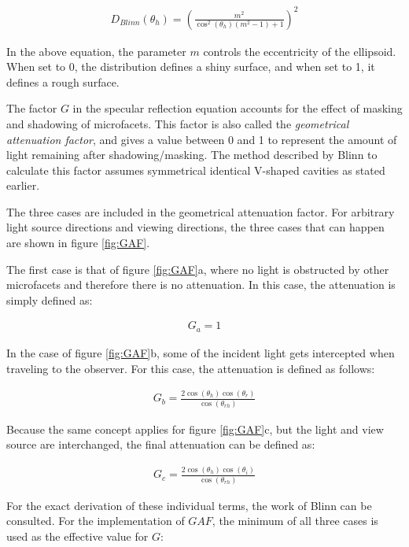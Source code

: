 	\begin{eqnarray*}
		D_{Blinn}(\theta_h) = \left({ \frac{m^2}{\cos^2(\theta_h)(m^2-1)+1} } \right)^2
	\end{eqnarray*}

\noindent In the above equation, the parameter $m$ controls the eccentricity of the ellipsoid. When set to 0, the distribution defines a shiny surface, and when set to 1, it defines a rough surface.

The factor $G$ in the specular reflection equation accounts for the effect of masking and shadowing of microfacets. This factor is also called the \textit{geometrical attenuation factor}, and gives a value between 0 and 1 to represent the amount of light remaining after shadowing/masking. The method described by Blinn to calculate this factor assumes symmetrical identical V-shaped cavities as stated earlier. 

The three cases are included in the geometrical attenuation factor. For arbitrary light source directions and viewing directions, the three cases that can happen are shown in figure \ref{fig:GAF}.

The first case is that of figure \ref{fig:GAF}a, where no light is obstructed by other microfacets and therefore there is no attenuation. In this case, the attenuation is simply defined as:

	\begin{eqnarray*}
		G_a = 1
	\end{eqnarray*}

In the case of figure \ref{fig:GAF}b, some of the incident light gets intercepted when traveling to the observer. For this case, the attenuation is defined as follows:

	\begin{eqnarray*}
		G_b = \frac{2\cos(\theta_h)\cos(\theta_r)}{\cos(\theta_{rh})}
	\end{eqnarray*}

\noindent Because the same concept applies for figure \ref{fig:GAF}c, but the light and view source are interchanged, the final attenuation can be defined as:

	\begin{eqnarray*}
		G_c = \frac{2\cos(\theta_h)\cos(\theta_i)}{\cos(\theta_{rh})}
	\end{eqnarray*}

\noindent For the exact derivation of these individual terms, the work of Blinn \cite{Blinn} can be consulted. For the implementation of $GAF$, the minimum of all three cases is used as the effective value for $G$:


